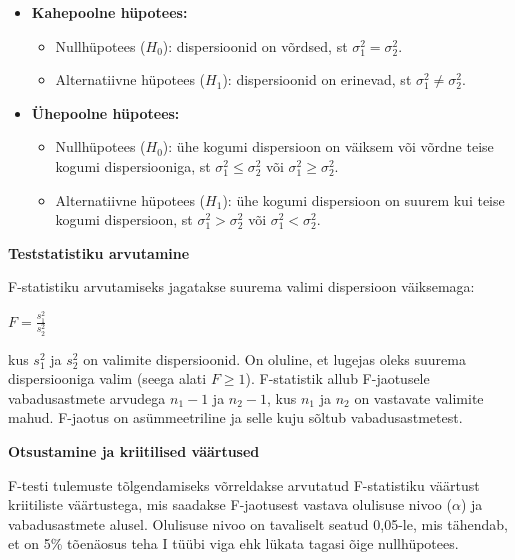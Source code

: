\documentclass[
]{book}
\providecommand{\tightlist}{%
  \setlength{\itemsep}{0pt}\setlength{\parskip}{0pt}}
\begin{document}
\begin{itemize}
\tightlist
\item
  \textbf{Kahepoolne hüpotees:}

  \begin{itemize}
  \tightlist
  \item
    Nullhüpotees (\(H_0\)): dispersioonid on võrdsed, st \(\sigma_1^2 = \sigma_2^2\).
  \item
    Alternatiivne hüpotees (\(H_1\)): dispersioonid on erinevad, st \(\sigma_1^2 \neq \sigma_2^2\).
  \end{itemize}
\item
  \textbf{Ühepoolne hüpotees:}

  \begin{itemize}
  \tightlist
  \item
    Nullhüpotees (\(H_0\)): ühe kogumi dispersioon on väiksem või võrdne teise kogumi dispersiooniga, st \(\sigma_1^2 \leq \sigma_2^2\) või \(\sigma_1^2 \geq \sigma_2^2\).
  \item
    Alternatiivne hüpotees (\(H_1\)): ühe kogumi dispersioon on suurem kui teise kogumi dispersioon, st \(\sigma_1^2 > \sigma_2^2\) või \(\sigma_1^2 < \sigma_2^2\).
  \end{itemize}
\end{itemize}

\textbf{Teststatistiku arvutamine}

F-statistiku arvutamiseks jagatakse suurema valimi dispersioon väiksemaga:

\(F = \frac{s_1^2}{s_2^2}\)

kus \(s_1^2\) ja \(s_2^2\) on valimite dispersioonid. On oluline, et lugejas oleks suurema dispersiooniga valim (seega alati \(F \geq 1\)). F-statistik allub F-jaotusele vabadusastmete arvudega \(n_1 - 1\) ja \(n_2 - 1\), kus \(n_1\) ja \(n_2\) on vastavate valimite mahud. F-jaotus on asümmeetriline ja selle kuju sõltub vabadusastmetest.

\textbf{Otsustamine ja kriitilised väärtused}

F-testi tulemuste tõlgendamiseks võrreldakse arvutatud F-statistiku väärtust kriitiliste väärtustega, mis saadakse F-jaotusest vastava olulisuse nivoo (\(\alpha\)) ja vabadusastmete alusel. Olulisuse nivoo on tavaliselt seatud 0,05-le, mis tähendab, et on 5\% tõenäosus teha I tüübi viga ehk lükata tagasi õige nullhüpotees.
\end{document}
